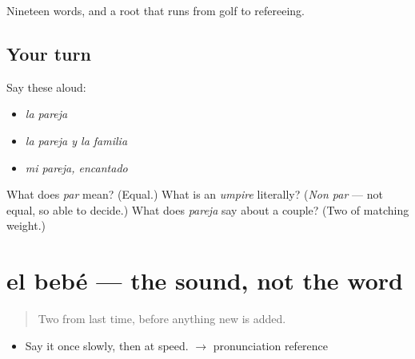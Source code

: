\begin{grammarlens}[title={What you've built}]
Nineteen words, and a root that runs from golf to refereeing.
\end{grammarlens}

\subsection*{Your turn}
Say these aloud:

\begin{itemize}
\raggedright
  \item \emph{la pareja}
  \item \emph{la pareja y la familia}
  \item \emph{mi pareja, encantado}
\end{itemize}

\begin{tcolorbox}[breakable,colback=teal!4,colframe=teal!35!black,title={Before you move on}]
What does \emph{par} mean? (Equal.) What is an \emph{umpire} literally? (\emph{Non par} --- not equal, so able to decide.) What does \emph{pareja} say about a couple? (Two of matching weight.)
\end{tcolorbox}
\section[el bebé]{el bebé --- the sound, not the word}

\label{lesson:ES-C309-bebe}



\begin{quote}
Two from last time, before anything new is added.
\end{quote}

\begin{sounds}
\begin{itemize}
\raggedright
  \item Say it once slowly, then at speed. $\to$ pronunciation reference
\end{itemize}
\end{sounds}

